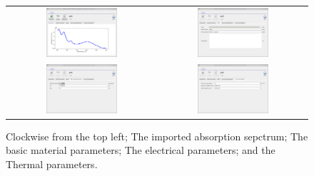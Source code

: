\begin{figure}[H]
\centering
\begin{tabular}{ c c }

\includegraphics[width=0.5\textwidth,height=0.4\textwidth]{./images/database_final.png}

&
\includegraphics[width=0.5\textwidth,height=0.4\textwidth]{./images/database_material_basic.png}
\\

\includegraphics[width=0.5\textwidth,height=0.4\textwidth]{./images/database_electrical_parameters.png}

&
\includegraphics[width=0.5\textwidth,height=0.4\textwidth]{./images/database_thermal_params.png}
\\
\end{tabular}
\caption{Clockwise from the top left; The imported absorption sepctrum; The basic material parameters; The electrical parameters; and the Thermal parameters.}
\label{fig:materialadd7}
\end{figure}




